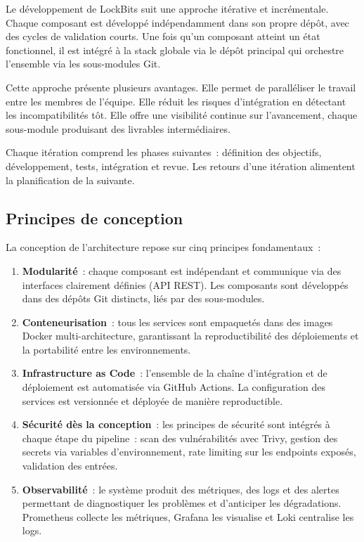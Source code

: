 Le développement de LockBits suit une approche itérative et
incrémentale. Chaque composant est développé indépendamment dans son
propre dépôt, avec des cycles de validation courts. Une fois qu'un
composant atteint un état fonctionnel, il est intégré à la stack
globale via le dépôt principal qui orchestre l'ensemble via les
sous-modules Git.

Cette approche présente plusieurs avantages. Elle permet de paralléliser
le travail entre les membres de l'équipe. Elle réduit les risques
d'intégration en détectant les incompatibilités tôt. Elle offre une
visibilité continue sur l'avancement, chaque sous-module produisant des
livrables intermédiaires.

Chaque itération comprend les phases suivantes~:
définition des objectifs, développement, tests, intégration et revue.
Les retours d'une itération alimentent la planification de la suivante.

\subsection{Principes de conception}

La conception de l'architecture repose sur cinq principes fondamentaux~:

\begin{enumerate}
  \item \textbf{Modularité}~: chaque composant est indépendant et
    communique via des interfaces clairement définies (API REST). Les
    composants sont développés dans des dépôts Git distincts, liés par
    des sous-modules.
  \item \textbf{Conteneurisation}~: tous les services sont empaquetés
    dans des images Docker multi-architecture, garantissant la
    reproductibilité des déploiements et la portabilité entre les
    environnements.
  \item \textbf{Infrastructure as Code}~: l'ensemble de la chaîne
    d'intégration et de déploiement est automatisée via GitHub Actions.
    La configuration des services est versionnée et déployée de manière
    reproductible.
  \item \textbf{Sécurité dès la conception}~: les principes de sécurité
    sont intégrés à chaque étape du pipeline~: scan des vulnérabilités
    avec Trivy, gestion des secrets via variables d'environnement,
    rate limiting sur les endpoints exposés, validation des entrées.
  \item \textbf{Observabilité}~: le système produit des métriques, des
    logs et des alertes permettant de diagnostiquer les problèmes et
    d'anticiper les dégradations. Prometheus collecte les métriques,
    Grafana les visualise et Loki centralise les logs.
\end{enumerate}


